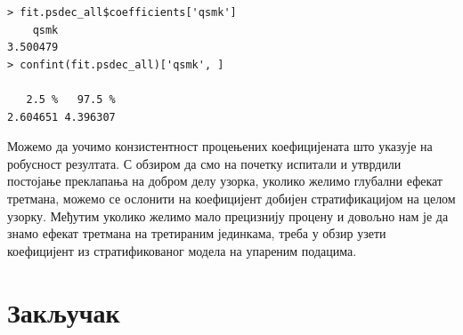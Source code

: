 \documentclass[12pt, a4paper]{article}
\begin{document}
\begin{verbatim}
> fit.psdec_all$coefficients['qsmk']
    qsmk 
3.500479 
> confint(fit.psdec_all)['qsmk', ]

   2.5 %   97.5 % 
2.604651 4.396307 
\end{verbatim}


Можемо да уочимо конзистентност процењених коефицијената што указује на робусност резултата. С обзиром да смо на почетку испитали и утврдили постојање преклапања на добром делу узорка, уколико желимо глубални ефекат третмана, можемо се ослонити на коефицијент добијен стратификацијом на целом узорку. Међутим уколико желимо мало прецизнију процену и довољно нам је да знамо ефекат третмана на третираним јединкама, треба у обзир узети коефицијент из стратификованог модела на упареним подацима.




%

\newpage
\section{Закључак}
\end{document}

